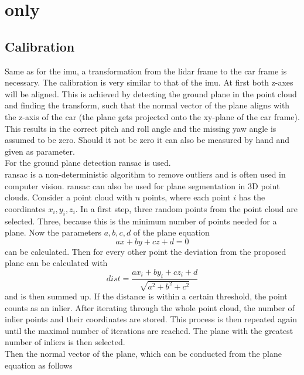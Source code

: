 \section{ only}
\subsection{Calibration}
Same as for the \gls{imu}, a transformation from the \gls{lidar} frame to the car frame is necessary.
The calibration is very similar to that of the \gls{imu}.
At first both z-axes will be aligned.
This is achieved by detecting the ground plane in the point cloud and finding the transform, such that the normal vector of the plane aligns with the z-axis of the car (the plane gets projected onto the xy-plane of the car frame).
This results in the correct pitch and roll angle and the missing yaw angle is assumed to be zero.
Should it not be zero it can also be measured by hand and given as parameter.\\
For the ground plane detection \gls{ransac} \cite{Fischler1981} is used.\\
\gls{ransac} is a non-deterministic algorithm to remove outliers and is often used in computer vision.
\gls{ransac} can also be used for plane segmentation in 3D point clouds.
Consider a point cloud with $n$ points, where each point $i$ has the coordinates $x_i, y_i, z_i$.
In a first step, three random points from the point cloud are selected.
Three, because this is the minimum number of points needed for a plane.
Now the parameters $a, b, c, d$ of the plane equation
\begin{equation}
    ax + by + cz + d = 0
\end{equation}
can be calculated.
Then for every other point the deviation from the proposed plane can be calculated with
\begin{equation}
    dist = \frac{ax_i + by_i + cz_i + d}{\sqrt{a^2 + b^2 + c^2}}
\end{equation}
and is then summed up.
If the distance is within a certain threshold, the point counts as an inlier.
After iterating through the whole point cloud, the number of inlier points and their coordinates are stored.
This process is then repeated again until the maximal number of iterations are reached.
The plane with the greatest number of inliers is then selected.\\
Then the normal vector of the plane, which can be conducted from the plane equation as follows
